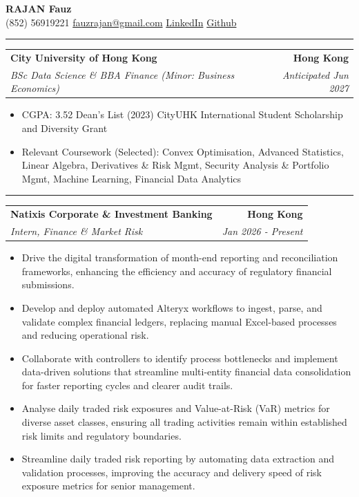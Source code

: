 \documentclass[9pt,a4paper]{article}
\makeatletter
\newcommand{\ressection}[1]{%
  \vspace{0.8em}%
  \noindent{\large\scshape\bfseries #1}\par\nobreak
  \vspace{-\parskip}%
  \vspace{-\parskip}%
  \vspace{-\parskip}%
  \vspace{-\parskip}%
  \noindent\rule{\linewidth}{0.1pt}\par\nobreak
  \vspace{-\parskip}%
}
\newcommand{\resumeSubheading}[4]{%
  \vspace{0.6em}%
  \begin{tabular*}{\textwidth}{l@{\extracolsep{\fill}}r}
    \textbf{#1} & \textbf{#2} \\
    \textit{\small #3} & \textit{\small #4} \\
  \end{tabular*}\vspace{0.32em}}
\makeatother
\begin{document}
\begin{center}
  {\LARGE\bfseries RAJAN Fauz}\\[0.35em]
  \small
  (852) 56919221 \;\textbar\;
  \href{mailto:fauzrajan@gmail.com}{fauzrajan@gmail.com} \;\textbar\;
  \href{https://www.linkedin.com/in/fauzrajan}{LinkedIn} \;\textbar\;
  \href{https://github.com/FauzRajan}{Github}
\end{center}
\vspace{-0.15em}

\ressection{Education}

\resumeSubheading{City University of Hong Kong}{Hong Kong}{BSc Data Science \& BBA Finance (Minor: Business Economics)}{Anticipated Jun 2027}
\begin{itemize}
  \item CGPA: 3.52 \;\textbar\; Dean's List (2023) \;\textbar\; CityUHK International Student Scholarship and Diversity Grant
  \item Relevant Coursework (Selected): Convex Optimisation, Advanced Statistics, Linear Algebra, Derivatives \& Risk Mgmt, Security Analysis \& Portfolio Mgmt, Machine Learning, Financial Data Analytics
\end{itemize}

\ressection{Work Experience}

\resumeSubheading{Natixis Corporate \& Investment Banking}{Hong Kong}{Intern, Finance \& Market Risk}{Jan 2026 - Present}
\begin{itemize}
  \item Drive the digital transformation of month-end reporting and reconciliation frameworks, enhancing the efficiency and accuracy of regulatory financial submissions.
  \item Develop and deploy automated Alteryx workflows to ingest, parse, and validate complex financial ledgers, replacing manual Excel-based processes and reducing operational risk.
  \item Collaborate with controllers to identify process bottlenecks and implement data-driven solutions that streamline multi-entity financial data consolidation for faster reporting cycles and clearer audit trails.
  \item Analyse daily traded risk exposures and Value-at-Risk (VaR) metrics for diverse asset classes, ensuring all trading activities remain within established risk limits and regulatory boundaries.
  \item Streamline daily traded risk reporting by automating data extraction and validation processes, improving the accuracy and delivery speed of risk exposure metrics for senior management.
\end{itemize}
\end{document}
